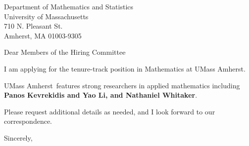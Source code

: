 




	
	
	\def\School{UMass Amherst}
	
	\begin{letter}
		{
			Department of Mathematics and Statistics\\
			University of Massachusetts\\
			710 N. Pleasant St.\\
			Amherst, MA 01003-9305
		}
		
		\opening{Dear Members of the Hiring Committee}
		
		
		I am applying for the tenure-track position in Mathematics at \School. 
		
		\School~features strong researchers in applied mathematics including \textbf{Panos Kevrekidis and Yao Li, and Nathaniel Whitaker}. 
		
		
		
		
		
		Please request additional details as needed, and I look forward to our correspondence.
		
		\closing{Sincerely,}
	\end{letter}
